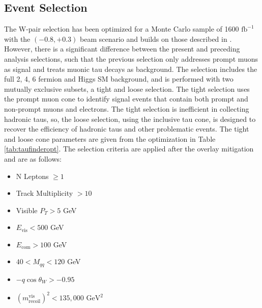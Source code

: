 \subsection{Event Selection}
\label{subsec:EventSelection}
The W-pair selection has been optimized for a Monte Carlo sample of 1600 $\text{fb}^{-1}$ with the $(-0.8,+0.3)$ beam scenario and builds on those described in \cite{ivan}. However, there is a significant difference between the present and preceding analysis selections, such that  the previous selection only addresses prompt muons as signal and treats muonic tau decays as background. The selection includes the full 2, 4, 6 fermion and Higgs SM background, and is performed with two mutually exclusive subsets, a tight and loose selection. The tight selection uses the prompt muon cone to identify signal events that contain both prompt and non-prompt muons and electrons. The tight selection is inefficient in collecting hadronic taus, so, the loose selection, using the inclusive tau cone, is designed to recover the efficiency of hadronic taus and other problematic events. The tight and loose cone parameters are given from the optimization in Table \ref{tab:taufinderopt}. The selection criteria are applied after the overlay mitigation and are as follows:
\begin{itemize}
\item N Leptons $\geq 1$
\item Track Multiplicity $> 10$  
\item Visible $P_T > 5$ GeV  
\item $E_{\text{vis}} < 500$ GeV 
\item $E_{\text{com}} > 100$ GeV
\item $40<M_{qq}<120$ GeV
\item  $-q\cos\theta_W > -0.95$
\item  $(m^{\text{vis}}_{\text{recoil}})^2 < 135,000 \, \, \text{GeV}^2$
\end{itemize}

